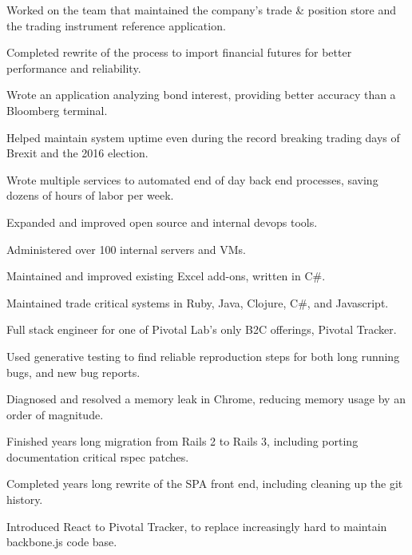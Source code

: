 \documentclass[]{deedy-resume-openfont}
\begin{document}
\vspace{\topsep}
\begin{tightemize}
\item Worked on the team that maintained the company's trade \& position store and the trading instrument reference application.
\item Completed rewrite of the process to import financial futures for better performance and reliability.
\item Wrote an application analyzing bond interest, providing better accuracy than a Bloomberg terminal.
\item Helped maintain system uptime even during the record breaking trading days of Brexit and the 2016 election.
\item Wrote multiple services to automated end of day back end processes, saving dozens of hours of labor per week.
\item Expanded and improved open source and internal devops tools.
\item Administered over 100 internal servers and VMs.
\item Maintained and improved existing Excel add-ons, written in C\#.
\item Maintained trade critical systems in Ruby, Java, Clojure, C\#, and Javascript.
\end{tightemize}
\sectionsep

\vspace{\topsep}
Full stack engineer for one of Pivotal Lab's only B2C offerings, Pivotal Tracker.
\vspace{\topsep}
\begin{tightemize}
\item Used generative testing to find reliable reproduction steps for both long running bugs, and new bug reports.
\item Diagnosed and resolved a memory leak in Chrome, reducing memory usage by an order of magnitude.
\item Finished years long migration from Rails 2 to Rails 3, including porting documentation critical rspec patches.
\item Completed years long rewrite of the SPA front end, including cleaning up the git history.
\item Introduced React to Pivotal Tracker, to replace increasingly hard to maintain backbone.js code base.
\end{tightemize}
\end{document}
